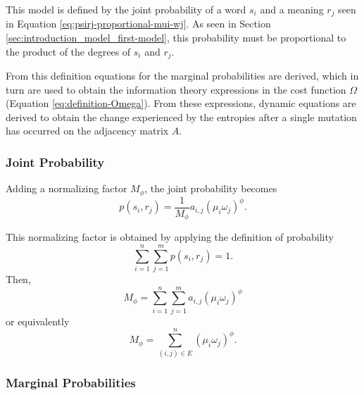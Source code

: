 This model is defined by the joint probability of a word $s_i$ and a meaning $r_j$ seen in Equation \ref{eq:psirj-proportional-mui-wj}.
As seen in Section \ref{sec:introduction_model_first-model}, this probability must be proportional to the product of the degrees of $s_i$ and $r_j$.

From this definition equations for the marginal probabilities are derived, which in turn are used to obtain the information theory expressions in the cost function $\Omega$ (Equation \eqref{eq:definition-Omega}).
From these expressions, dynamic equations are derived to obtain the change experienced by the entropies after a single mutation has occurred on the adjacency matrix $A$.

\subsubsection{Joint Probability}

Adding a normalizing factor $M_\phi$, the joint probability becomes
\begin{equation}
  \label{eq:definition-psirj_first-model}
  p(s_i, r_j) = \frac{1}{M_\phi} a_{i,j} (\mu_i \omega_j)^\phi.
\end{equation}

This normalizing factor is obtained by applying the definition of probability
\begin{equation*}
  \sum_{i=1}^n \sum_{j=1}^m p(s_i, r_j) = 1.
\end{equation*}
Then,
\begin{equation*}
  M_\phi = \sum_{i=1}^n \sum_{j=1}^m a_{i,j} (\mu_i \omega_j)^\phi
\end{equation*}
or equivalently
\begin{equation}
  \label{eq:definition-Mphi}
  M_\phi = \sum_{(i,j) \in E}^n (\mu_i \omega_j)^\phi.
\end{equation}

\subsubsection{Marginal Probabilities}

